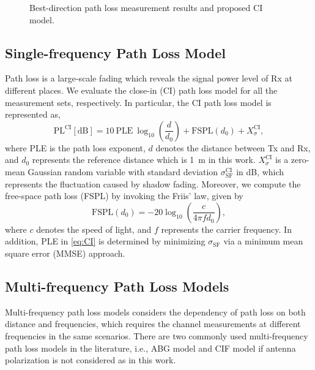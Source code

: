 \documentclass[conference]{IEEEtran}
\begin{document}
 \begin{figure*}[htbp]

\centering
{}
\centering
{}

\centering
{}
\centering
{}
\caption{Best-direction path loss measurement results and proposed CI model.}
\label{fig:pathloss} 
\end{figure*}
\subsection{Single-frequency Path Loss Model}
Path loss is a large-scale fading which reveals the signal power level of Rx at different places. We evaluate the close-in (CI) path loss model for all the measurement sets, respectively. In particular, the CI path loss model is represented as,
\begin{equation}
\text{PL}^{\text{CI}}[\text{dB}]=10\ \text{PLE}\ \log_{10}{(\frac{d}{d_0})}+\text{FSPL}(d_0)+X^{\text{CI}}_\sigma,
\label{eq:CI}
\end{equation}
where PLE is the path loss exponent, $d$ denotes the distance between Tx and Rx, and $d_0$ represents the reference distance which is 1~m in this work. $X^{\text{CI}}_\sigma$ is a zero-mean Gaussian random variable with standard deviation $\sigma^{\text{CI}}_{\text{SF}}$ in dB, which represents the fluctuation caused by shadow fading. Moreover, we compute the free-space path loss (FSPL) by invoking the Friis' law, given by
    \begin{equation}
    \text{FSPL}(d_0)=-20\log_{10}(\frac{c}{4\pi fd_0}),
    \label{eq:fspl}
    \end{equation}
where $c$ denotes the speed of light, and $f$ represents the carrier frequency. In addition, PLE in \eqref{eq:CI} is determined by minimizing $\sigma_{\text{SF}}$ via a minimum mean square error (MMSE) approach.

\subsection{Multi-frequency Path Loss Models}
Multi-frequency path loss models considers the dependency of path loss on both distance and frequencies, which requires the channel measurements at different frequencies in the same scenarios. There are two commonly used multi-frequency path loss models in the literature, i.e., ABG model and CIF model if antenna polarization is not considered as in this work.
\end{document}
